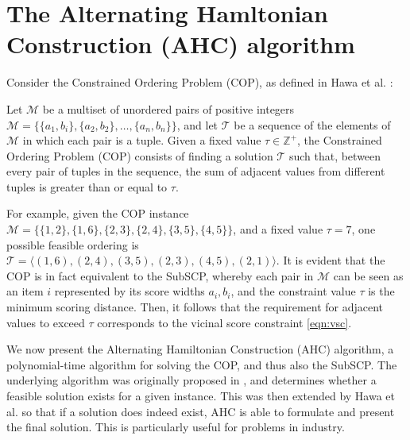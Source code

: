 \documentclass{elsarticle}
\begin{document}
\section{The Alternating Hamltonian Construction (AHC) algorithm}
\label{sec:ahc}
\noindent Consider the Constrained Ordering Problem (COP), as defined in Hawa et al. \cite{hawa2018}:

\begin{definition}
	\label{defn:cop}
	Let $\mathcal{M}$ be a multiset of unordered pairs of positive integers $\mathcal{M} = \{\{a_1, b_i\}, \{a_2, b_2\},\dotsc,\{a_n, b_n\}\}$, and let $\mathcal{T}$ be a sequence of the elements of $\mathcal{M}$ in which each pair is a tuple. Given a fixed value $\tau \in \mathbb{Z}^+$, the Constrained Ordering Problem (COP) consists of finding a solution $\mathcal{T}$ such that, between every pair of tuples in the sequence, the sum of adjacent values from different tuples is greater than or equal to $\tau$.
\end{definition}

\noindent For example, given the COP instance $\mathcal{M} = \{\{1,2\}, \{1,6\}, \{2,3\}, \{2,4\}, \{3,5\}, \{4,5\}\}$, and a fixed value $\tau = 7$, one possible feasible ordering is $\mathcal{T} = \langle(1,6), (2,4), (3,5), (2,3), (4,5), (2,1)\rangle$. It is evident that the COP is in fact equivalent to the SubSCP, whereby each pair in $\mathcal{M}$ can be seen as an item $i$ represented by its score widths $a_i, b_i$, and the constraint value $\tau$ is the minimum scoring distance. Then, it follows that the requirement for adjacent values to exceed $\tau$ corresponds to the vicinal score constraint \eqref{eqn:vsc}.

We now present the Alternating Hamiltonian Construction (AHC) algorithm, a polynomial-time algorithm for solving the COP, and thus also the SubSCP. The underlying algorithm was originally proposed in \cite{becker2010}, and determines whether a feasible solution exists for a given instance. This was then extended by Hawa et al. \cite{hawa2018} so that if a solution does indeed exist, AHC is able to formulate and present the final solution. This is particularly useful for problems in industry. 
\end{document}

